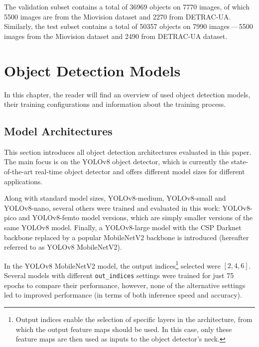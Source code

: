 The validation subset contains a total of \num{36969} objects on \num{7770}
images, of which \num{5500} images are from the Miovision dataset and \num{2270}
from DETRAC-UA. Similarly, the test subset contains a total of \num{50357}
objects on \num{7990} images\,---\,\num{5500} images from the Miovision dataset and
\num{2490} from DETRAC-UA dataset.




\chapter{Object Detection Models}
\label{ModelsChapter}





In this chapter, the reader will find an overview of used object detection
models, their training configurations and information about the training
process.


\section{Model Architectures}


This section introduces all object detection architectures evaluated in this
paper.  The main focus is on the YOLOv8 object detector, which is currently the
state-of-the-art real-time object detector and offers different model sizes for
different applications.

Along with standard model sizes, YOLOv8-medium, YOLOv8-small and YOLOv8-nano,
several others were trained and evaluated in this work: YOLOv8-pico and
YOLOv8-femto model versions, which are simply smaller versions of the same
YOLOv8 model. Finally, a YOLOv8-large model with the CSP Darknet backbone
replaced by a popular MobileNetV2 backbone is introduced (hereafter referred to
as YOLOv8 MobileNetV2).

In the YOLOv8 MobileNetV2 model, the output indices\footnote{Output indices
enable the selection of specific layers in the architecture, from which the
output feature maps should be used. In this case, only these feature maps are
then used as inputs to the object detector's neck.} selected were $[2, 4, 6]$.
Several models with different \texttt{out\_indices} settings were trained for
just 75 epochs to compare their performance, however, none of the alternative
settings led to improved performance (in terms of both inference speed and
accuracy).

